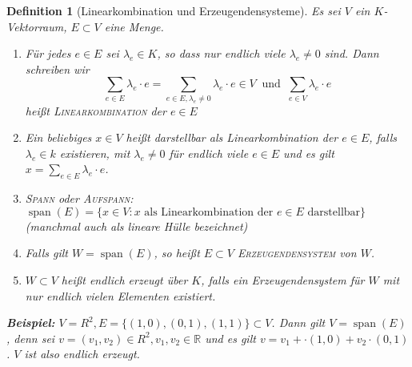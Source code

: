 \documentclass{report}
\newcommand{\lb}{\lambda}
\newcommand{\R}{\mathbb{R}}
\DeclareMathOperator{\Span}{span}
\theoremstyle{customrem}
\theoremstyle{customdef}
\newtheorem{definition}{Definition}[chapter]
\theoremstyle{customenv}
\newcommand{\defemph}[1]{\textsc{#1}}
\begin{document}
	\begin{definition}[Linearkombination und Erzeugendensysteme]
		Es sei \(V\) ein \(K\)-Vektorraum, \(E \subset V\) eine Menge.
		
		\begin{enumerate}
			\item Für jedes \(e \in E\) sei \(\lb_e \in K\), so dass nur endlich viele \(\lb_e \neq 0\) sind. Dann schreiben wir 
			\[
			\sum_{e \in E}\lb_e \cdot e = \sum_{e\in E, \lb_e \neq 0} \lb_e \cdot e \in V\ \text{ und }\ \sum_{e \in V} \lb_e \cdot e
			\]
			heißt \defemph{Linearkombination} der \(e \in E\)
			\item Ein beliebiges \(x \in V\) heißt darstellbar als Linearkombination der \(e \in E\), falls \(\lb_e \in k\) existieren, mit \(\lb_e \neq 0\) für endlich viele \(e \in E\) und es gilt \(x = \sum_{e \in E}\lb_e \cdot e\).
			\item \defemph{Spann} oder \defemph{Aufspann}: \(\Span(E) = \{x \in V : x \text{ als Linearkombination der } e \in E \text{ darstellbar}\}\) (manchmal auch als lineare Hülle bezeichnet)
			\item Falls gilt \(W = \Span(E)\), so heißt \(E \subset V\) \defemph{Erzeugendensystem} von \(W\).
			\item \(W \subset V\) heißt endlich erzeugt über \(K\), falls ein Erzeugendensystem für \(W\) mit nur endlich vielen Elementen existiert.
		\end{enumerate}
		\textbf{Beispiel: } 
		\(V = R^2, E = \{(1, 0), (0, 1), (1, 1)\} \subset V\). Dann gilt \(V = \Span(E)\), denn sei \(v = (v_1, v_2) \in R^2, v_1, v_2 \in \R\) und es gilt \(v = v_1 + \cdot (1, 0) + v_2 \cdot (0, 1)\). \(V\) ist also endlich erzeugt.
		
	\end{definition}
	
\end{document}
